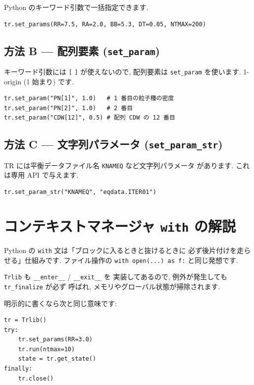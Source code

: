 \documentclass[11pt,a4paper]{report}
\begin{document}
Python のキーワード引数で一括指定できます.

\begin{lstlisting}[style=py]
tr.set_params(RR=7.5, RA=2.0, BB=5.3, DT=0.05, NTMAX=200)
\end{lstlisting}

\subsection{方法 B — 配列要素 (\texttt{set\_param})}

キーワード引数には \texttt{[} \texttt{]} が使えないので, 配列要素は
\texttt{set\_param} を使います. 1-origin (1 始まり) です.

\begin{lstlisting}[style=py]
tr.set_param("PN[1]", 1.0)   # 1 番目の粒子種の密度
tr.set_param("PN[2]", 1.0)   # 2 番目
tr.set_param("CDW[12]", 0.5) # 配列 CDW の 12 番目
\end{lstlisting}

\subsection{方法 C — 文字列パラメータ (\texttt{set\_param\_str})}

TR には平衡データファイル名 \texttt{KNAMEQ} など文字列パラメータ
があります. これは専用 API で与えます.

\begin{lstlisting}[style=py]
tr.set_param_str("KNAMEQ", "eqdata.ITER01")
\end{lstlisting}

\section{コンテキストマネージャ \texttt{with} の解説}

\begin{note}
Python の \texttt{with} 文は「ブロックに入るときと抜けるときに
必ず後片付けを走らせる」仕組みです. ファイル操作の
\texttt{with open(...) as f:} と同じ発想です.

\texttt{Trlib} も \texttt{\_\_enter\_\_} / \texttt{\_\_exit\_\_} を
実装してあるので, 例外が発生しても \texttt{tr\_finalize} が必ず
呼ばれ, メモリやグローバル状態が掃除されます.
\end{note}

明示的に書くなら次と同じ意味です:

\begin{lstlisting}[style=py]
tr = Trlib()
try:
    tr.set_params(RR=3.0)
    tr.run(ntmax=10)
    state = tr.get_state()
finally:
    tr.close()
\end{lstlisting}
\end{document}
